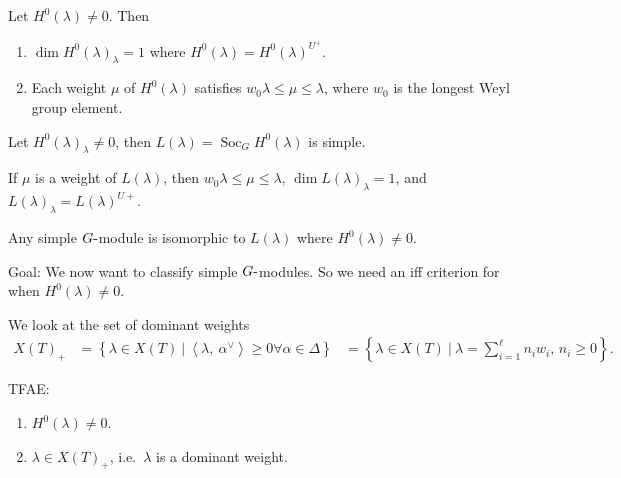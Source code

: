 \begin{remark}

Let \(H^0(\lambda) \neq 0\). Then

\begin{enumerate}
\def\labelenumi{\alph{enumi}.}
\item
  \(\dim H^0(\lambda)_\lambda = 1\) where
  \(H^0(\lambda) = H^0(\lambda)^{U^+}\).
\item
  Each weight \(\mu\) of \(H^0(\lambda)\) satisfies
  \(w_0 \lambda \leq \mu \leq \lambda\), where \(w_0\) is the longest
  Weyl group element.
\end{enumerate}

\end{remark}

\begin{remark}

Let \(H^0(\lambda)_\lambda \neq 0\), then
\(L(\lambda) = \operatorname{Soc}_G H^0(\lambda)\) is simple.

\end{remark}

\begin{remark}

If \(\mu\) is a weight of \(L(\lambda)\), then
\(w_0 \lambda \leq \mu \leq \lambda\), \(\dim L(\lambda)_\lambda = 1\),
and \(L(\lambda)_\lambda = L(\lambda)^{U+}\).

\end{remark}

\begin{remark}

Any simple \(G{\hbox{-}}\)module is isomorphic to \(L(\lambda)\) where
\(H^0(\lambda) \neq 0\).

\end{remark}

Goal: We now want to classify simple \(G{\hbox{-}}\)modules. So we need
an iff criterion for when \(H^0(\lambda) \neq 0\).

We look at the set of dominant weights
\begin{align*}  
X(T)_+ 
&= \left\{{\lambda \in X(T) {~\mathrel{\Big|}~}{\left\langle {\lambda},~{\alpha^\vee} \right\rangle}\geq 0 \forall \alpha\in\Delta}\right\}
&= \left\{{\lambda \in X(T) {~\mathrel{\Big|}~}\lambda = \sum_{i=1}^\ell n_i w_i,\, n_i \geq 0}\right\}
.\end{align*}

\begin{theorem}[?]

TFAE:

\begin{enumerate}
\def\labelenumi{\arabic{enumi}.}
\tightlist
\item
  \(H^0(\lambda) \neq 0\).
\item
  \(\lambda \in X(T)_+\), i.e.~\(\lambda\) is a dominant weight.
\end{enumerate}

\end{theorem}

